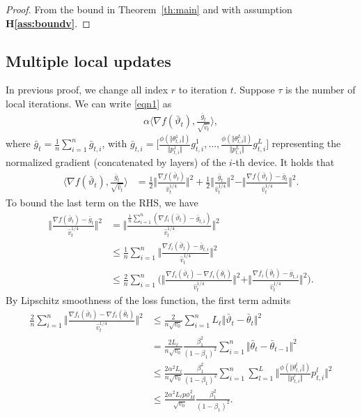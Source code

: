 \documentclass{article}
\begin{document}
\begin{proof}
From the bound in Theorem~\ref{th:main} and with assumption \textbf{H\ref{ass:boundv}}.
\end{proof}

\subsection{Multiple local updates}

In previous proof, we change all index $r$ to iteration $t$. Suppose $\tau$ is the number of local iterations. We can write \eqref{eqn1} as
\begin{align}
    \alpha \langle \nabla f(\bar \vartheta_t),\frac{\bar g_t}{\sqrt{\hat v_t}} \rangle,
\end{align}
where $\bar g_t=\frac{1}{n}\sum_{i=1}^n \bar g_{t,i}$, with $\bar g_{t,i}=\Big[\frac{\phi(\Vert \theta_{t,i}^1\Vert)}{\Vert p_{t,i}^1\Vert}g_{t,i}^1,..., \frac{\phi(\Vert \theta_{t,i}^L\Vert)}{\Vert p_{t,i}^L\Vert}g_{t,i}^L   \Big]$ representing the normalized gradient (concatenated by layers) of the $i$-th device. It holds that
\begin{align}
    \langle \nabla f(\bar \vartheta_t),\frac{\bar g_t}{\sqrt{\hat v_t}} \rangle&=\frac{1}{2}\Vert \frac{\nabla f(\bar\vartheta_t) }{\hat v_t^{1/4}}\Vert^2+\frac{1}{2}\Vert \frac{\bar g_t }{\hat v_t^{1/4}}\Vert^2-\Vert \frac{\nabla f(\bar\vartheta_t)-\bar g_t }{\hat v_t^{1/4}}\Vert^2.
\end{align}
To bound the last term on the RHS, we have
\begin{align}
    \Vert \frac{\nabla f(\bar\vartheta_t)-\bar g_t }{\hat v_t^{1/4}}\Vert^2&=\Vert \frac{\frac{1}{n}\sum_{i=1}^n (\nabla f_i(\bar\vartheta_t)-\bar g_{t,i})}{\hat v_t^{1/4}} \Vert^2\\
    &\leq \frac{1}{n}\sum_{i=1}^n\Vert \frac{\nabla f_i(\bar\vartheta_t)-\bar g_{t,i}}{\hat v_t^{1/4}} \Vert^2\\
    &\leq \frac{2}{n}\sum_{i=1}^n \Big(\Vert \frac{\nabla f_i(\bar\vartheta_t)-\nabla f_i(\bar\theta_t)}{\hat v_t^{1/4}} \Vert^2+\Vert \frac{\nabla f_i(\bar\theta_t)-\bar g_{t,i}}{\hat v_t^{1/4}} \Vert^2  \Big).
\end{align}
By Lipschitz smoothness of the loss function, the first term admits
\begin{align}
    \frac{2}{n}\sum_{i=1}^n\Vert \frac{\nabla f_i(\bar\vartheta_t)-\nabla f_i(\bar\theta_t)}{\hat v_t^{1/4}} \Vert^2&\leq \frac{2}{n \sqrt{v_0}}\sum_{i=1}^n L_\ell\Vert \bar\vartheta_t-\bar\theta_t\Vert^2  \\
    &=\frac{2L_\ell}{n \sqrt{v_0}}\frac{\beta_1^2}{(1-\beta_1)^2}\sum_{i=1}^n \Vert \bar\theta_t-\bar\theta_{t-1}\Vert ^2\\
    &\leq \frac{2\alpha^2 L_\ell }{n \sqrt{v_0}}\frac{\beta_1^2}{(1-\beta_1)^2} \sum_{i=1}^n \sum_{l=1}^L\Vert \frac{\phi(\Vert \theta_{t,i}^l\Vert)}{\Vert p_{t,i}^l\Vert}p_{t,i}^l \Vert^2\\
    &\leq \frac{2\alpha^2 L_\ell p\phi_M^2}{ \sqrt{v_0}}\frac{\beta_1^2}{(1-\beta_1)^2}.
\end{align}
\end{document}
